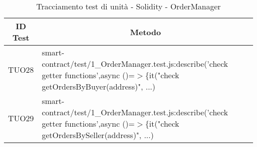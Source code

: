 \begin{table}[H]
  \centering
  \renewcommand{\arraystretch}{1.8}
  \begin{tabular}{c|p{15cm}}
    \rowcolor[HTML]{125E28}
    \color[HTML]{FFFFFF}\textbf{ID Test}
         & \multicolumn{1}{c}{\color[HTML]{FFFFFF}\textbf{Metodo}}                                                                                       \\
    \hline
    TUO28 & smart-contract/test/1\_OrderManager.test.js:describe('check getter functions',\newline async ()=$>$\{it("check getOrdersByBuyer(address)", ...)                                                                                       \\
    TUO29 & smart-contract/test/1\_OrderManager.test.js:describe('check getter functions',\newline async ()=$>$\{it("check getOrdersBySeller(address)", ...)                                                         \\                                                   
  \end{tabular}
  \caption{Tracciamento test di unità - Solidity - OrderManager}
\end{table}
